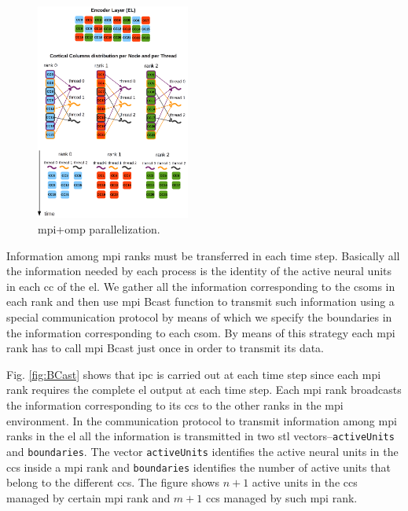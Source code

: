 \documentclass[10pt,journal,compsoc]{IEEEtran}
\begin{document}
\begin{figure}[h!]
    \centering
    \includegraphics[width=0.45\textwidth]{Encoder_Parallelization.png}
    \caption{ \gls{mpi}+\gls{omp} parallelization.}
    \label{fig:Encoder_Parallelization}
\end{figure}

Information among \gls{mpi} ranks must be transferred in each time step. Basically all the information needed by each process is the identity of the active neural units in each \gls{cc} of the \gls{el}. We gather all the information corresponding to the \glspl{csom} in each rank and then use \gls{mpi} Bcast function to transmit such information using a special communication protocol by means of which we specify the boundaries in the information corresponding to each \gls{csom}. By means of this strategy each \gls{mpi} rank has to call \gls{mpi} Bcast just once in order to transmit its data.

Fig. \ref{fig:BCast} shows that \gls{ipc} is carried out at each time step since each \gls{mpi} rank requires the complete \gls{el} output at each time step. Each \gls{mpi} rank broadcasts the information corresponding to its \glspl{cc} to the other ranks in the \gls{mpi} environment. In the communication protocol to transmit information among \gls{mpi} ranks in the \gls{el} all the information is transmitted in two \gls{stl} vectors--\texttt{activeUnits} and \texttt{boundaries}. The vector \texttt{activeUnits} identifies the active neural units in the \glspl{cc} inside a \gls{mpi} rank and \texttt{boundaries} identifies the number of active units that belong to the different \glspl{cc}. The figure shows $n+1$ active units in the \glspl{cc} managed by certain \gls{mpi} rank and $m+1$ \glspl{cc} managed by such \gls{mpi} rank.
\end{document}
